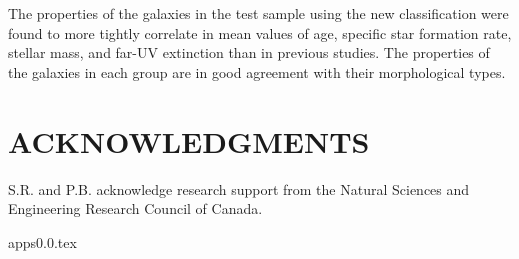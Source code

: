 \documentclass[useAMS,usenatbib]{mn2e}
\begin{document}
The properties of the galaxies in the test sample using the new
classification were found to more tightly correlate in mean values of age, specific star formation rate, stellar mass, and far-UV extinction than in previous studies. 
The properties of the galaxies in each group are in good agreement with their morphological types.

\section*{ACKNOWLEDGMENTS}
S.R. and P.B. acknowledge research support from the Natural Sciences and Engineering Research Council of Canada. 



{apps0.0.tex}
\end{document}
